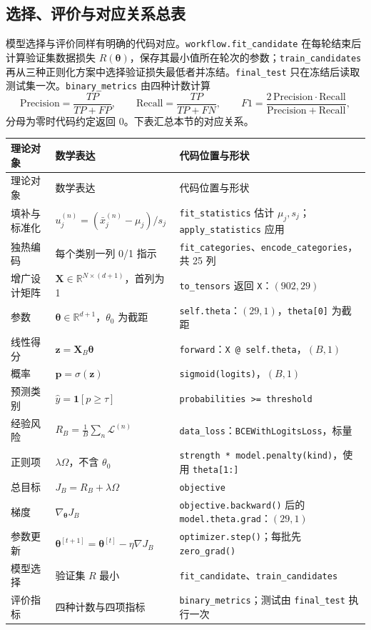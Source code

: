 \documentclass[UTF8,a4paper,11pt,fontset=fandol]{ctexart}
\begin{document}
\subsection{选择、评价与对应关系总表}
模型选择与评价同样有明确的代码对应。\texttt{workflow.fit\_candidate} 在每轮结束后计算验证集数据损失 $R(\boldsymbol\theta)$，保存其最小值所在轮次的参数；\texttt{train\_candidates} 再从三种正则化方案中选择验证损失最低者并冻结。\texttt{final\_test} 只在冻结后读取测试集一次。\texttt{binary\_metrics} 由四种计数计算
\begin{equation}
\mathrm{Precision}=\frac{TP}{TP+FP},\qquad
\mathrm{Recall}=\frac{TP}{TP+FN},\qquad
F1=\frac{2\,\mathrm{Precision}\cdot\mathrm{Recall}}{\mathrm{Precision}+\mathrm{Recall}},
\end{equation}
分母为零时代码约定返回 0。下表汇总本节的对应关系。
\begin{xltabular}{\linewidth}{L{2.6cm}L{4.4cm}Y}\toprule
理论对象 & 数学表达 & 代码位置与形状\\\midrule
\endfirsthead
\toprule
理论对象 & 数学表达 & 代码位置与形状\\\midrule
\endhead
填补与标准化 & $u_j^{(n)}=(\bar x_j^{(n)}-\mu_j)/s_j$ & \texttt{fit\_statistics} 估计 $\mu_j,s_j$；\texttt{apply\_statistics} 应用\\
独热编码 & 每个类别一列 0/1 指示 & \texttt{fit\_categories}、\texttt{encode\_categories}，共 25 列\\
增广设计矩阵 & $\mathbf X\in\mathbb R^{N\times(d+1)}$，首列为 1 & \texttt{to\_tensors} 返回 \texttt{X}：$(902,29)$\\
参数 & $\boldsymbol\theta\in\mathbb R^{d+1}$，$\theta_0$ 为截距 & \texttt{self.theta}：$(29,1)$，\texttt{theta[0]} 为截距\\
线性得分 & $\mathbf z=\mathbf X_B\boldsymbol\theta$ & \texttt{forward}：\texttt{X @ self.theta}，$(B,1)$\\
概率 & $\mathbf p=\sigma(\mathbf z)$ & \texttt{sigmoid(logits)}，$(B,1)$\\
预测类别 & $\hat y=\mathbf 1[p\ge\tau]$ & \texttt{probabilities >= threshold}\\
经验风险 & $R_B=\frac1B\sum_n\mathcal L^{(n)}$ & \texttt{data\_loss}：\texttt{BCEWithLogitsLoss}，标量\\
正则项 & $\lambda\Omega$，不含 $\theta_0$ & \texttt{strength * model.penalty(kind)}，使用 \texttt{theta[1:]}\\
总目标 & $J_B=R_B+\lambda\Omega$ & \texttt{objective}\\
梯度 & $\nabla_{\boldsymbol\theta}J_B$ & \texttt{objective.backward()} 后的 \texttt{model.theta.grad}：$(29,1)$\\
参数更新 & $\boldsymbol\theta^{[t+1]}=\boldsymbol\theta^{[t]}-\eta\nabla J_B$ & \texttt{optimizer.step()}；每批先 \texttt{zero\_grad()}\\
模型选择 & 验证集 $R$ 最小 & \texttt{fit\_candidate}、\texttt{train\_candidates}\\
评价指标 & 四种计数与四项指标 & \texttt{binary\_metrics}；测试由 \texttt{final\_test} 执行一次\\\bottomrule
\end{xltabular}
\clearpage
\end{document}
